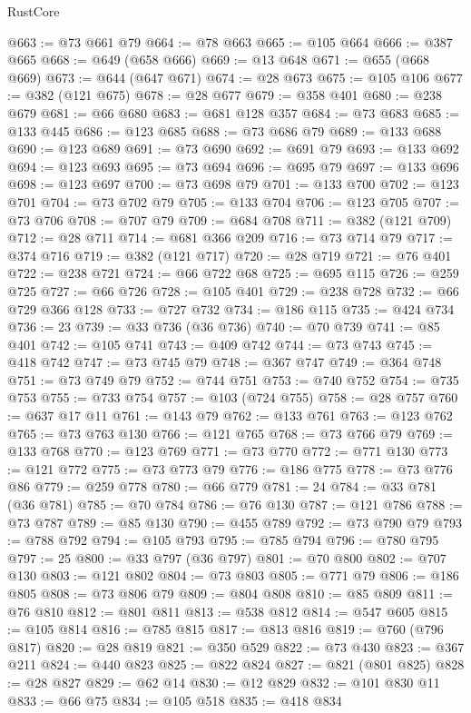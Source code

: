 \begin{lexlean}{RustCore}
\begin{coremodule}
@663 := @73 @661 @79
@664 := @78 @663
@665 := @105 @664
@666 := @387 @665
@668 := @649 (@658 @666)
@669 := @13 @648
@671 := @655 (@668 @669)
@673 := @644 (@647 @671)
@674 := @28 @673
@675 := @105 @106
@677 := @382 (@121 @675)
@678 := @28 @677
@679 := @358 @401
@680 := @238 @679
@681 := @66 @680
@683 := @681 @128 @357
@684 := @73 @683
@685 := @133 @445
@686 := @123 @685
@688 := @73 @686 @79
@689 := @133 @688
@690 := @123 @689
@691 := @73 @690
@692 := @691 @79
@693 := @133 @692
@694 := @123 @693
@695 := @73 @694
@696 := @695 @79
@697 := @133 @696
@698 := @123 @697
@700 := @73 @698 @79
@701 := @133 @700
@702 := @123 @701
@704 := @73 @702 @79
@705 := @133 @704
@706 := @123 @705
@707 := @73 @706
@708 := @707 @79
@709 := @684 @708
@711 := @382 (@121 @709)
@712 := @28 @711
@714 := @681 @366 @209
@716 := @73 @714 @79
@717 := @374 @716
@719 := @382 (@121 @717)
@720 := @28 @719
@721 := @76 @401
@722 := @238 @721
@724 := @66 @722 @68
@725 := @695 @115
@726 := @259 @725
@727 := @66 @726
@728 := @105 @401
@729 := @238 @728
@732 := @66 @729 @366 @128
@733 := @727 @732
@734 := @186 @115
@735 := @424 @734
@736 := 23
@739 := @33 @736 (@36 @736)
@740 := @70 @739
@741 := @85 @401
@742 := @105 @741
@743 := @409 @742
@744 := @73 @743
@745 := @418 @742
@747 := @73 @745 @79
@748 := @367 @747
@749 := @364 @748
@751 := @73 @749 @79
@752 := @744 @751
@753 := @740 @752
@754 := @735 @753
@755 := @733 @754
@757 := @103 (@724 @755)
@758 := @28 @757
@760 := @637 @17 @11
@761 := @143 @79
@762 := @133 @761
@763 := @123 @762
@765 := @73 @763 @130
@766 := @121 @765
@768 := @73 @766 @79
@769 := @133 @768
@770 := @123 @769
@771 := @73 @770
@772 := @771 @130
@773 := @121 @772
@775 := @73 @773 @79
@776 := @186 @775
@778 := @73 @776 @86
@779 := @259 @778
@780 := @66 @779
@781 := 24
@784 := @33 @781 (@36 @781)
@785 := @70 @784
@786 := @76 @130
@787 := @121 @786
@788 := @73 @787
@789 := @85 @130
@790 := @455 @789
@792 := @73 @790 @79
@793 := @788 @792
@794 := @105 @793
@795 := @785 @794
@796 := @780 @795
@797 := 25
@800 := @33 @797 (@36 @797)
@801 := @70 @800
@802 := @707 @130
@803 := @121 @802
@804 := @73 @803
@805 := @771 @79
@806 := @186 @805
@808 := @73 @806 @79
@809 := @804 @808
@810 := @85 @809
@811 := @76 @810
@812 := @801 @811
@813 := @538 @812
@814 := @547 @605
@815 := @105 @814
@816 := @785 @815
@817 := @813 @816
@819 := @760 (@796 @817)
@820 := @28 @819
@821 := @350 @529
@822 := @73 @430
@823 := @367 @211
@824 := @440 @823
@825 := @822 @824
@827 := @821 (@801 @825)
@828 := @28 @827
@829 := @62 @14
@830 := @12 @829
@832 := @101 @830 @11
@833 := @66 @75
@834 := @105 @518
@835 := @418 @834

\end{coremodule}
\end{lexlean}
